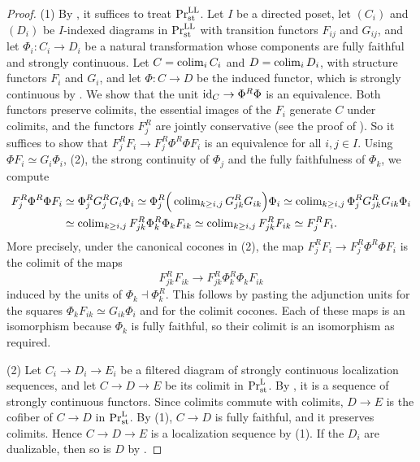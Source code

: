 	\begin{proof}
		(1) By , it suffices to treat $\textup{Pr}^{\mathrm{LL}}_{\operatorname{st}}$. Let $I$ be a directed poset, let $(C_i)$ and $(D_i)$ be $I$-indexed diagrams in $\textup{Pr}^{\mathrm{LL}}_{\operatorname{st}}$ with transition functors $F_{ij}$ and $G_{ij}$, and let $\Phi_i\colon C_i \to D_i$ be a natural transformation whose components are fully faithful and strongly continuous. Let $C = \operatorname{colim}_i C_i$ and $D = \operatorname{colim}_i D_i$, with structure functors $F_i$ and $G_i$, and let $\Phi\colon C \to D$ be the induced functor, which is strongly continuous by . We show that the unit $\operatorname{id}_C \to \Phi^R\Phi$ is an equivalence. Both functors preserve colimits, the essential images of the $F_i$ generate $C$ under colimits, and the functors $F_j^R$ are jointly conservative (see the proof of ). So it suffices to show that $F_j^RF_i \to F_j^R\Phi^R\Phi F_i$ is an equivalence for all $i,j \in I$. Using $\Phi F_i \simeq G_i\Phi_i$, (2), the strong continuity of $\Phi_j$ and the fully faithfulness of $\Phi_k$, we compute
		\begin{align*}
			F_j^R\Phi^R\Phi F_i &\simeq \Phi_j^RG_j^RG_i\Phi_i \simeq \Phi_j^R\Big(\operatorname{colim}_{k \geq i,j} G_{jk}^RG_{ik}\Big)\Phi_i \simeq \operatorname{colim}_{k \geq i,j} \Phi_j^RG_{jk}^RG_{ik}\Phi_i \\
			&\simeq \operatorname{colim}_{k \geq i,j} F_{jk}^R\Phi_k^R\Phi_kF_{ik} \simeq \operatorname{colim}_{k \geq i,j} F_{jk}^RF_{ik} \simeq F_j^RF_i.
		\end{align*}
		More precisely, under the canonical cocones in (2), the map $F_j^RF_i \to F_j^R\Phi^R\Phi F_i$ is the colimit of the maps
		\[
			F_{jk}^RF_{ik} \longrightarrow F_{jk}^R\Phi_k^R\Phi_kF_{ik}
		\]
		induced by the units of $\Phi_k \dashv \Phi_k^R$. This follows by pasting the adjunction units for the squares $\Phi_kF_{ik} \simeq G_{ik}\Phi_i$ and for the colimit cocones. Each of these maps is an isomorphism because $\Phi_k$ is fully faithful, so their colimit is an isomorphism as required.

		(2) Let $C_i \to D_i \to E_i$ be a filtered diagram of strongly continuous localization sequences, and let $C \to D \to E$ be its colimit in $\textup{Pr}^{\textup{L}}_{\operatorname{st}}$. By , it is a sequence of strongly continuous functors. Since colimits commute with colimits, $D \to E$ is the cofiber of $C \to D$ in $\textup{Pr}^{\textup{L}}_{\operatorname{st}}$. By (1), $C \to D$ is fully faithful, and it preserves colimits. Hence $C \to D \to E$ is a localization sequence by (1). If the $D_i$ are dualizable, then so is $D$ by .
	\end{proof}

